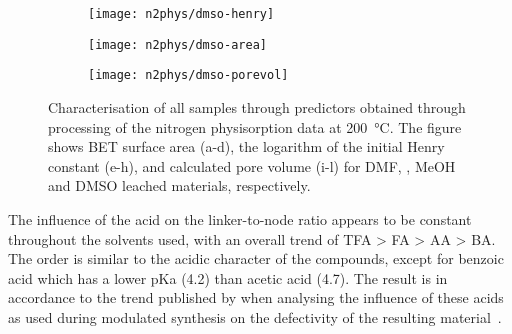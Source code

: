 \begin{figure}[p]
    \begin{subfigure}{0.33\linewidth}
		\parbox[c]{0.12\linewidth}{\caption{}%
			\label{def:fgr:n2phys-dmso-henry}}%
		\parbox[b]{0.88\linewidth}{%
			\texttt{[image: n2phys/dmso-henry]}%
		}%
    \end{subfigure}%
    \begin{subfigure}{0.33\linewidth}
		\parbox[c]{0.12\linewidth}{\caption{}%
			\label{def:fgr:n2phys-dmso-area}}%
		\parbox[b]{0.88\linewidth}{%
			\texttt{[image: n2phys/dmso-area]}%
		}%
    \end{subfigure}%
    \begin{subfigure}{0.33\linewidth}
		\parbox[c]{0.12\linewidth}{\caption{}%
			\label{def:fgr:n2phys-dmso-porevol}}%
		\parbox[b]{0.88\linewidth}{%
			\texttt{[image: n2phys/dmso-porevol]}%
		}%
    \end{subfigure}%

    \caption{Characterisation of all samples through predictors
    obtained through processing of the nitrogen physisorption 
    data at \SI{200}{\degreeCelsius}. The figure shows BET surface
    area (a-d), the logarithm of the initial Henry constant (e-h), 
    and calculated pore volume (i-l) for DMF, , MeOH and 
    DMSO leached materials, respectively.}%
    \label{def:fgr:nitrogen-predictors}
    
\end{figure}

The influence of the acid on the linker-to-node ratio appears to be
constant throughout the solvents used, with an overall trend of 
TFA > FA > AA > BA. The order is similar
to the acidic character of the compounds, except for
benzoic acid which has a lower pKa (4.2) than acetic acid (4.7).
The result is in accordance to the trend published by 
\citeauthor{shearerDefectEngineeringTuning2016} when analysing
the influence of these acids as used during modulated synthesis on the
defectivity of the resulting material~\cite{shearerDefectEngineeringTuning2016}.

